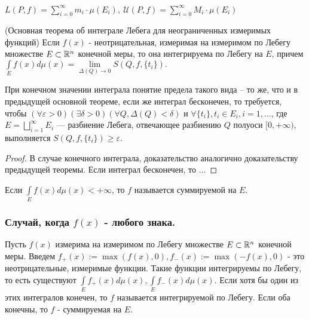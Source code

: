 $L(P, f)=\sum\limits_{i=0}^{\infty}m_i\cdot \mu(E_i),\  \mathcal{U}(P, f)=\sum\limits_{i=0}^{\infty}M_i\cdot \mu(E_i)$ 

\begin{theorem}(Основная теорема об интеграле Лебега для неограниченных измеримых функций)
Если $f(x)$ - неотрицательная, измеримая на измеримом по Лебегу множестве $E\subset \mathbb{R}^n$ конечной меры, то она интегрируема по Лебегу на $E$, причем
$\int\limits_E f(x)d\mu(x)=\lim\limits_{\Delta(Q)\to0}S(Q, f, \{t_i\}).$ 

При конечном значении интеграла понятие предела такого вида -- то же, что и в предыдущей основной теореме, если же интеграл бесконечен, то требуется, чтобы \newline$(\forall \varepsilon>0) (\exists \delta > 0)(\forall Q, \Delta(Q)<\delta) \text{ и } \forall \{t_i\}, t_i \in E_i, i=1,\ldots$, где $E=\bigsqcup\limits_{i=1}^{\infty} E_i$ --- разбиение Лебега, отвечающее разбиению $Q$ полуоси $[0, +\infty)$, выполняется $S(Q, f, \{t_i\})\geqslant\varepsilon$.
\end{theorem}

\begin{proof}
В случае конечного интеграла, доказательство аналогично доказательству предыдущей теоремы. Если интеграл бесконечен, то $\ldots$
\end{proof}

\begin{Def}
Если $\int\limits_E f(x)d\mu(x) < +\infty$, то $f$ называется суммируемой на $E$.
\end{Def}

\subsubsection{Случай, когда $f(x)$ - любого знака.}
Пусть $f(x)$ измерима на измеримом по Лебегу множестве $E \subset \mathbb{R}^n$ конечной меры. Введем $f_+(x):=\max(f(x), 0), f_-(x):=\max(-f(x), 0)$ - это неотрицательные, измеримые функции. Такие функции интегрируемы по Лебегу, то есть существуют $\int\limits_E f_+(x)d\mu(x), \int\limits_E f_-(x)d\mu(x)$. Если хотя бы один из этих интегралов конечен, то $f$ называется интегрируемой по Лебегу. Если оба конечны, то $f$ - суммируемая на $E$.



